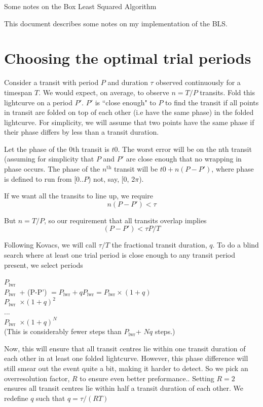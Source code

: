 \documentclass[11pt]{article}
\newcommand{\Plwr}{\ensuremath{P_{\mathrm{lwr}}}}
\begin{document}
\begin{center}
\begin{Huge} Some notes on the Box Least Squared Algorithm \end{Huge}
\end{center}

This document describes some notes on my implementation of the BLS.

\section{Choosing the optimal trial periods}

Consider a transit with period $P$ and duration $\tau$ observed continuously
for a timespan $T$. We would expect, on average, to observe $n = T/P$ transits.
Fold this lightcurve on a period $P'$. $P'$ is ``close enough" to $P$ to find the transit if
all points in transit are folded on top of each other (i.e have the same phase) in the folded lightcurve. For simplicity, we will assume that two points have the same phase if their phase differs by less than a transit duration.

Let the phase of the 0th transit is $t0$. The worst error will be on the nth transit (assuming for simplicity that $P$ and $P'$ are close enough that no wrapping in phase occurs. The phase of the $n^{\mathrm{th}}$ transit will be $t0 + n(P-P')$,  where  phase is defined to run from [0..$P$) not, say, [0, 2$\pi$).

If we want all the transits to line up, we require
$$
n(P-P') < \tau
$$

But $n = T/P$, so our requirement that all transits overlap implies 
$$
(P-P') < \tau P/T
$$

Following Kovacs, we will call $\tau/T$ the fractional transit duration, $q$.
To do a blind search where at least one trial period is close enough
to any transit period present, we select periods

\noindent
\Plwr\\
\Plwr\ + (P-P') $= \Plwr + q \Plwr = \Plwr \times (1+q)$\\
\Plwr\ $\times (1+q)^2$\\
...\\
\Plwr\ $\times (1+q)^N$\\

\noindent
(This is considerably fewer steps than \Plwr + $Nq$ steps.)

Now, this will ensure that all transit centres lie within one transit
duration of each other in at least one folded lightcurve. However, this phase difference will still smear out the event quite a bit, making it harder to detect. So we pick an overresolution factor, $R$ to
ensure even better preformance.. Setting $R=2$ ensures
all transit centres lie within half a transit duration of each other. We redefine $q$ such that
$q = \tau/(RT)$
\end{document}
